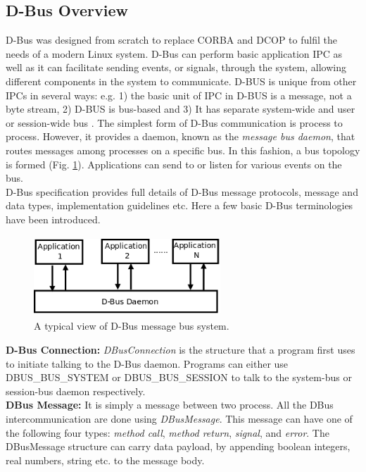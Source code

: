 \documentclass[draft]{ifacconf}
\begin{document}
\subsection{D-Bus Overview}
D-Bus was designed from scratch to replace CORBA and DCOP  to fulfil the needs of a modern Linux system. D-Bus can perform basic application IPC as well as it can facilitate sending events, or signals, through the system, allowing different components in the system to communicate. D-BUS is unique from other IPCs in several ways: e.g. 1) the basic unit of IPC in D-BUS is a message, not a byte stream, 2) D-BUS is bus-based and 3) It has separate system-wide and user or session-wide bus \citep{Love2005}. The simplest form of D-Bus communication is process to process. However, it provides a daemon, known as the {\em message bus daemon}, that routes messages among processes on a specific bus. In this fashion, a bus topology is formed (Fig. \ref{fig:dbus-daemon}). Applications can send to or listen for various events on the bus.\\
D-Bus specification \citep{Pennington+2010} provides full details of D-Bus message protocols, message and data types, implementation guidelines etc. Here a few basic D-Bus terminologies have been introduced.\\ 
\begin{figure}
\begin{center}
\includegraphics[width=7cm,height=3.0cm]{./dia-files/dbus-daemon} %
\caption{A typical view of D-Bus message bus system. } 
\label{fig:dbus-daemon}
\end{center}
\end{figure}
\textbf{D-Bus Connection: }
\textit{DBusConnection} is the structure that a program first uses to initiate talking to the D-Bus daemon. Programs can either use DBUS\_BUS\_SYSTEM or DBUS\_BUS\_SESSION to talk to the system-bus or session-bus daemon respectively.\\
\textbf{DBus Message: }
It is simply a message between two process. All the DBus intercommunication are done using \textit{DBusMessage}. This message can have one of the following four types: \textit{method call}, \textit{method return}, \textit{signal}, and \textit{error}. The DBusMessage structure can carry data payload, by appending boolean integers, real numbers, string etc. to the message body.\\ 
\end{document}
